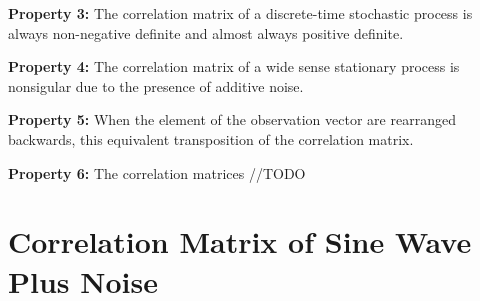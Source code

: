 \documentclass{article}
\begin{document}
    \noindent\textbf{Property 3:} The correlation matrix of a discrete-time stochastic process is always non-negative
    definite and almost always positive definite.

    \noindent\textbf{Property 4:} The correlation matrix of a wide sense stationary process is nonsigular due to the 
    presence of additive noise.

    \noindent\textbf{Property 5:} When the element of the observation vector are rearranged backwards, this equivalent
    transposition of the correlation matrix.
    
    \noindent\textbf{Property 6:} The correlation matrices //TODO

    \section{Correlation Matrix of Sine Wave Plus Noise}
\end{document}
